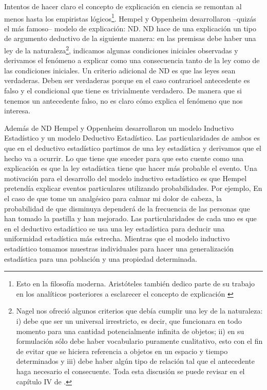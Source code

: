 Intentos de hacer claro el concepto de explicación en ciencia se remontan al menos hasta los empiristas lógicos\footnote{Esto en la filosofía moderna. Aristóteles también dedico parte de su trabajo en los analíticos posteriores a esclarecer el concepto de explicación \cite{Aristoteles2009}}. Hempel y Oppenheim desarrollaron --quizás el más famoso-- modelo de explicación: ND. ND hace de una explicación un tipo de argumento deductivo de la siguiente manera: en las premisas debe haber una ley de la naturaleza\footnote{Nagel nos ofreció algunos criterios que debía cumplir una ley de la naturaleza: i) debe que ser un universal irrestricto, es decir, que funcionara en todo momento para una cantidad potencialmente infinita de objetos; ii) en su formulación sólo debe haber vocabulario puramente cualitativo, esto con el fin de evitar que se hiciera referencia a objetos en un espacio y tiempo determinados y iii) debe haber algún tipo de relación tal que el antecedente haga necesario el consecuente. Toda esta discusión se puede revisar en el capítulo IV de \cite{Nagel2006}.}, indicamos algunas condiciones iniciales observadas y derivamos el fenómeno a explicar como una consecuencia tanto de la ley como de las condiciones iniciales. Un criterio adicional de ND es que las leyes sean verdaderas. Deben ser verdaderas porque en el caso contrarioel antecedente es falso y el condicional que tiene es trivialmente verdadero. De manera que si tenemos un antecedente falso, no es claro cómo explica el fenómeno que nos interesa.

Además de ND Hempel y Oppenheim desarrollaron un modelo Inductivo Estadístico y un modelo Deductivo Estadístico. Las particularidades de ambos es que en el deductivo estadístico partimos de una ley estadística y derivamos que el hecho va a ocurrir. Lo que tiene que suceder para que esto cuente como una explicación es que la ley estadística tiene que hacer más probable el evento. Una motivación para el desarrollo del modelo inductivo estadístico es que Hempel pretendía explicar eventos particulares utilizando probabilidades. Por ejemplo, En el caso de que tome un analgésico para calmar mi dolor de cabeza, la probabilidad de que disminuya dependerá de la frecuencia de las personas que han tomado la pastilla y han mejorado. Las particularidades de cada uno es que en el deductivo estadístico se usa una ley estadística para deducir una uniformidad estadística más estrecha. Mientras que el modelo inductivo estadístico tomamos muestras individuales para hacer una generalización estadística para una población y una propiedad determinada.

